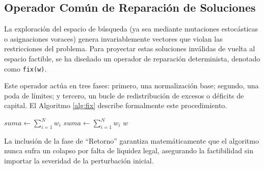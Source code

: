 \subsection{Operador Común de Reparación de Soluciones}
La exploración del espacio de búsqueda (ya sea mediante mutaciones estocásticas o asignaciones voraces) genera invariablemente vectores que violan las restricciones del problema. Para proyectar estas soluciones inválidas de vuelta al espacio factible, se ha diseñado un operador de reparación determinista, denotado como \texttt{fix(w)}.

Este operador actúa en tres fases: primero, una normalización base; segundo, una poda de límites; y tercero, un bucle de redistribución de excesos o déficits de capital. El Algoritmo \ref{alg:fix} describe formalmente este procedimiento.

\begin{algorithm}[H]
\SetAlgoLined
{}
 $suma \leftarrow \sum_{i=1}^{N} w_i$\;
 $suma \leftarrow \sum_{i=1}^{N} w_i$\;
 \Return $w$\;
 \caption{Operador de Reparación \texttt{fix(w)}}
 \label{alg:fix}
\end{algorithm}

La inclusión de la fase de ``Retorno'' garantiza matemáticamente que el algoritmo nunca sufra un colapso por falta de liquidez legal, asegurando la factibilidad sin importar la severidad de la perturbación inicial.